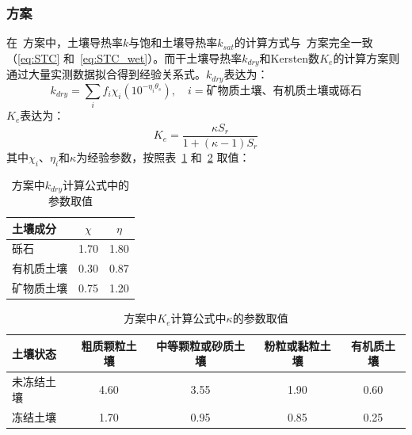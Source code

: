 \subsubsection{\citet{cote2005}方案}
在~\citet{cote2005}方案中，土壤导热率$k$与饱和土壤导热率$k_{sat}$的计算方式与~\citet{Johansen1975}方案完全一致（\eqref{eq:STC} 和~\eqref{eq:STC_wet}）。而干土壤导热率$k_{dry}$和Kersten数$K_e$的计算方案则通过大量实测数据拟合得到经验关系式。$k_{dry}$表达为：
\begin{equation}\label{eq:STC_dry_CK}
k_{dry}=\sum_if_i\chi_i(10^{-\eta_i\theta_s}),\quad i=\text{矿物质土壤、有机质土壤或砾石}
\end{equation}
$K_e$表达为：
\begin{equation}
K_e=\frac{\kappa S_r}{1+(\kappa -1)S_r}
\end{equation}
其中$\chi_i$、$\eta_i$和$\kappa$为经验参数，按照表~\ref{tab:Cote2005方案中k计算参数取值} 和~\ref{tab:Cote2005方案中k计算参数kappa取值} 取值：
\begin{table}[htbp]
    \centering
    \caption{\citet{cote2005}方案中$k_{dry}$计算公式中的参数取值}
    \label{tab:Cote2005方案中k计算参数取值}
    \begin{tabular}{@{}lcc@{}}
    \toprule
    土壤成分               & $\chi$     & $\eta$  \\
    \midrule
    砾石                  & 1.70      & 1.80  \\
    有机质土壤                  & 0.30    & 0.87   \\
    矿物质土壤         & 0.75   & 1.20    \\
    \bottomrule
    \end{tabular}
\end{table}
%
\begin{table}[htbp]
    \centering
    \caption{\citet{cote2005}方案中$K_e$计算公式中$\kappa$的参数取值}
    \label{tab:Cote2005方案中k计算参数kappa取值}
    \begin{tabular}{@{}lcccc@{}}
    \toprule
    土壤状态               & 粗质颗粒土壤     & 中等颗粒或砂质土壤 & 粉粒或黏粒土壤 & 有机质土壤  \\
    \midrule
    未冻结土壤             & 4.60      & 3.55   & 1.90    &  0.60  \\
    冻结土壤              & 1.70    & 0.95     & 0.85  & 0.25   \\
    \bottomrule
    \end{tabular}
\end{table}

